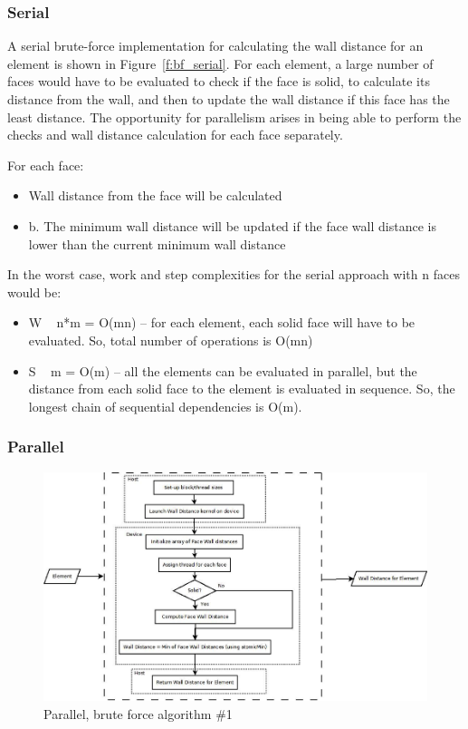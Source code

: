 \documentclass[]{aiaa-tc}%
\begin{document}
\subsubsection{Serial}
A serial brute-force implementation for calculating the wall distance
for an element is shown in Figure~\ref{f:bf_serial}. For each element, a large number of faces would have to be evaluated to check if the face is solid, to calculate its distance from the wall, and then to update the wall distance if this face has the least distance. The opportunity for parallelism arises in being able to perform the checks and wall distance calculation for each face separately.

For each face:
\begin{itemize}
  \item Wall distance from the face will be calculated
  \item b.	The minimum wall distance will be updated if the face wall distance is lower than the current minimum wall distance
\end{itemize}

In the worst case, work and step complexities for the serial approach
with n faces would be:

\begin{itemize}
  \item W ~ n*m = O(mn) – for each element, each solid face will have to be evaluated.  So, total number of operations is O(mn)
  \item S ~ m = O(m) – all the elements can be evaluated in parallel, but the distance from each solid face to the element is evaluated in sequence.  So, the longest chain of sequential dependencies is O(m).
\end{itemize}

\subsubsection{Parallel}

\begin{figure}
  \includegraphics{figures/brute_force/bf_parallel1_block}
  \caption{Parallel, brute force algorithm \#1}
  \label{f:bf_parallel1}
\end{figure}
\end{document}
